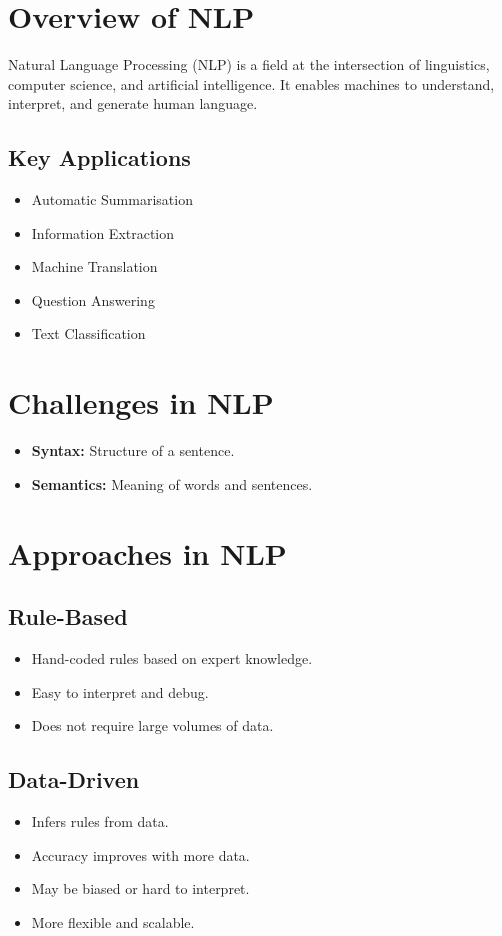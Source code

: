 \section{Overview of NLP}
Natural Language Processing (NLP) is a field at the intersection of linguistics, computer science, and artificial intelligence. It enables machines to understand, interpret, and generate human language.

\subsection{Key Applications}
\begin{itemize}
    \item Automatic Summarisation
    \item Information Extraction
    \item Machine Translation
    \item Question Answering
    \item Text Classification
\end{itemize}

\section{Challenges in NLP}
\begin{itemize}
    \item \textbf{Syntax:} Structure of a sentence.
    \item \textbf{Semantics:} Meaning of words and sentences.
\end{itemize}

\section{Approaches in NLP}
\subsection{Rule-Based}
\begin{itemize}
    \item Hand-coded rules based on expert knowledge.
    \item Easy to interpret and debug.
    \item Does not require large volumes of data.
\end{itemize}

\subsection{Data-Driven}
\begin{itemize}
    \item Infers rules from data.
    \item Accuracy improves with more data.
    \item May be biased or hard to interpret.
    \item More flexible and scalable.
\end{itemize}

